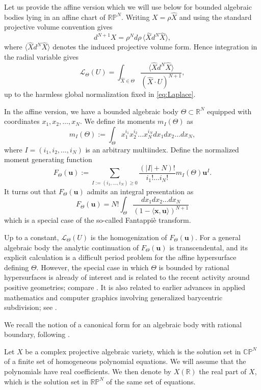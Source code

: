\documentclass[10pt,a4paper,reqno]{amsart}
\newcommand {\bR} {\mathbb R}
\newcommand {\bCP} {\mathbb {CP}}
\newcommand {\bRP} {\mathbb {RP}}
\newcommand{\LL}{\mathcal L}
\newcommand{\uu}{\mathbf u}
\newcommand{\xx}{\mathbf x}
\theoremstyle{plain}
\theoremstyle{definition}
\begin{document}
 Let us provide the affine version which we will use below for bounded algebraic bodies lying in an affine chart of $\bRP^N$.  Writing $X=\rho \widehat X$ and using the standard projective volume convention gives
\[
 d^{N+1}X=\rho^N d\rho\,\langle \widehat X d^N \widehat X \rangle,
\]
where $\langle \widehat X d^N \widehat X \rangle$ denotes the induced projective volume form.  Hence integration in the radial variable gives
\[
\LL_\Theta(U)=\int_{\widehat X\in \Theta}
\frac{\langle \widehat X d^N \widehat X \rangle}
{(\widehat X\cdot U)^{N+1}},
\]
up to the harmless global normalization fixed in \eqref{eq:Laplace}.

In the affine version, we have a bounded algebraic body $\Theta\subset \bR^N$ equipped with coordinates $x_1,x_2,\dots, x_N$.
We define its moments $m_I(\Theta)$ as 
$$m_I(\Theta):=\int_\Theta x_1^{i_1}x_2^{i_2}\dots x_N^{i_N} dx_1dx_2\dots dx_N,$$
where $I=(i_1,i_2,\dots, i_N)$ is an arbitrary multiindex. 
Define the normalized moment generating function
$$F_\Theta(\uu):=\sum_{I:=(i_1,\dots, i_N)\ge 0}\frac{(| I |+N)!}{i_1!\dots i_N!} m_I(\Theta)\uu^I.
$$
It turns out that $F_\Theta(\uu)$ admits an integral presentation as
\begin{equation}\label{eq:main}
F_\Theta(\uu)=N! \int_\Theta \frac {dx_1dx_2\dots dx_N}{(1-\langle \xx, \uu\rangle)^{N+1}}
\end{equation}
which is a special case of the so-called Fantappi\`e transform. 

Up to a constant, $\LL_\Theta(U)$ is the homogenization of $F_\Theta(\uu)$.  For a general algebraic body the analytic continuation of $F_\Theta(\uu)$ is transcendental, and its explicit calculation is a difficult period problem for the affine hypersurface defining $\Theta$.  However, the special case in which $\Theta$ is bounded by rational hypersurfaces is already of interest and is related to the recent activity around positive geometries; compare \cite{AHBL}. It is also related to earlier advances in applied mathematics and computer graphics involving generalized barycentric subdivision; see \cite{Wa}. 

We recall the notion of a canonical form for an algebraic body with rational boundary, following \cite{AHBL}.

Let $X$ be a complex projective algebraic variety, which is the solution set in $\bCP^N$ of a finite set of homogeneous polynomial equations. We will assume that the polynomials have real coefficients. We then denote by $X(\bR)$ the real part of $X$, which is the solution set in $\bRP^N$ of the same set of equations.
\end{document}
